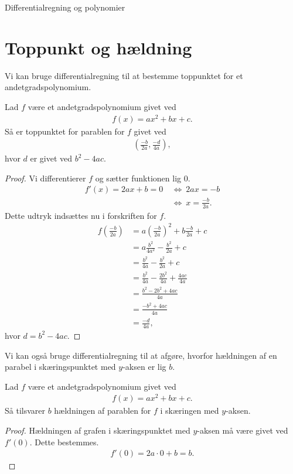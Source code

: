 \begin{center}
\Huge
Differentialregning og polynomier
\end{center}

\section*{Toppunkt og hældning}

Vi kan bruge differentialregning til at bestemme toppunktet for et andetgradspolynomium.
\begin{setn}[Toppunktsformlen]
	Lad $f$ være et andetgradspolynomium givet ved
	\begin{align*}
		f(x) = ax^2+bx+c.
	\end{align*}
	Så er toppunktet for parablen for $f$ givet ved
	\begin{align*}
		\left(\frac{-b}{2a},\frac{-d}{4a} \right),
	\end{align*}
	hvor $d$ er givet ved $b^2-4ac$.
\end{setn}
\begin{proof}
	Vi differentierer $f$ og sætter funktionen lig $0$. 
	\begin{align*}
		f'(x) = 2ax+b=0 \ &\Leftrightarrow \ 2ax = -b \\
		&\Leftrightarrow \ x = \frac{-b}{2a}.
	\end{align*}
	Dette udtryk indsættes nu i forskriften for $f$.
	\begin{align*}
		f\left( \frac{-b}{2a}\right) &= a\left(\frac{-b}{2a}\right)^2 + b\frac{-b}{2a} + c\\
		&= a \frac{b^2}{4a^2} - \frac{b^2}{2a} + c \\
		&= \frac{b^2}{4a} - \frac{b^2}{2a} + c \\
		&= \frac{b^2}{4a} - \frac{2b^2}{4a} + \frac{4ac}{4a} \\
		&= \frac{b^2 - 2b^2 + 4ac}{4a} \\
		&= \frac{-b^2 + 4ac}{4a} \\
		&= \frac{-d}{4a},
	\end{align*}
	hvor $d=b^2-4ac$.
\end{proof}
Vi kan også bruge differentialregning til at afgøre, hvorfor hældningen af en parabel i skæringspunktet med $y$-aksen er lig $b$.
\begin{setn}
	Lad $f$ være et andetgradspolynomium givet ved
	\begin{align*}
		f(x) = ax^2+bx+c.
	\end{align*}
	Så tilsvarer $b$ hældningen af parablen for $f$ i skæringen med $y$-aksen. 
\end{setn}
\begin{proof}
	Hældningen af grafen i skæringspunktet med $y$-aksen må være givet ved $f'(0)$. Dette bestemmes.
	\begin{align*}
		f'(0) = 2a\cdot 0 + b = b.
	\end{align*}
\end{proof}

